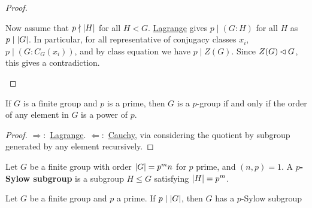 \begin{proof}
\begin{enumerate}
\begin{itemize}
            Now assume that $p \nmid \left|H\right|$ for all $H < G$. \hyperref[thm: Lagrange]{Lagrange} gives $p \mid (G : H)$ for all $H$ as $p \mid \left|G\right|$. In particular, for all representative of conjugacy classes $x_i$, $p \mid (G : C_G(x_i))$, and by class equation we have $p \mid Z(G)$. Since $Z(G) \lhd G$, this gives a contradiction.
        \end{itemize}
    \end{enumerate}
\end{proof}

\begin{corollary}\label{cor: p group iff order of any element is a power of p}
    If $G$ is a finite group and $p$ is a prime, then $G$ is a $p$-group if and only if the order of any element in $G$ is a power of $p$.
\end{corollary}

\begin{proof}
    $\Rightarrow:$ \hyperref[thm: Lagrange]{Lagrange}. $\Leftarrow:$ \hyperref[thm: Cauchy]{Cauchy}, via considering the quotient by subgroup generated by any element recursively.
\end{proof}

\begin{definition}
    Let $G$ be a finite group with order $\left|G\right| = p^m n$ for $p$ prime, and $(n, p) = 1$. A \textbf{$p$-Sylow subgroup} is a subgroup $H \leq G$ satisfying $\left|H\right| = p^m$. 
\end{definition}

\begin{theorem}[Sylow I]\label{thm: Sylow I}
    Let $G$ be a finite group and $p$ a prime. If $p \mid \left|G\right|$, then $G$ has a $p$-Sylow subgroup
\end{theorem}

